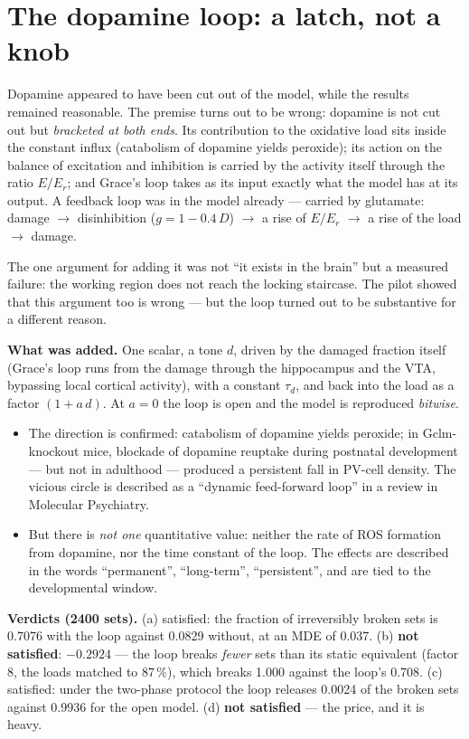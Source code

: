 \section{The dopamine loop: a latch, not a knob}\label{sec:dopa}
Dopamine appeared to have been cut out of the model, while the results remained reasonable. The premise turns out to be wrong: dopamine is not cut out but \emph{bracketed at both ends}. Its contribution to the oxidative load sits inside the constant influx (catabolism of dopamine yields peroxide); its action on the balance of excitation and inhibition is carried by the activity itself through the ratio $E/E_r$; and Grace's loop takes as its input exactly what the model has at its output. A feedback loop was in the model already --- carried by glutamate: damage $\to$ disinhibition ($g=1-0.4\,D$) $\to$ a rise of $E/E_r$ $\to$ a rise of the load $\to$ damage.

The one argument for adding it was not ``it exists in the brain'' but a measured failure: the working region does not reach the locking staircase. The pilot showed that this argument too is wrong --- but the loop turned out to be substantive for a different reason.

\textbf{What was added.} One scalar, a tone $d$, driven by the damaged fraction itself (Grace's loop runs from the damage through the hippocampus and the VTA, bypassing local cortical activity), with a constant $\tau_d$, and back into the load as a factor $(1+a\,d)$. At $a=0$ the loop is open and the model is reproduced \emph{bitwise}.

\facts
\begin{itemize}
\item The direction is confirmed: catabolism of dopamine yields peroxide; in Gclm-knockout mice, blockade of dopamine reuptake during postnatal development --- but not in adulthood --- produced a persistent fall in PV-cell density. The vicious circle is described as a ``dynamic feed-forward loop'' in a review in Molecular Psychiatry.\tP
\item But there is \emph{not one} quantitative value: neither the rate of ROS formation from dopamine, nor the time constant of the loop. The effects are described in the words ``permanent'', ``long-term'', ``persistent'', and are tied to the developmental window.\tS
\end{itemize}

\textbf{Verdicts (2400 sets).} (a) satisfied: the fraction of irreversibly broken sets is 0.7076 with the loop against 0.0829 without, at an MDE of 0.037. (b) \textbf{not satisfied}: $-0.2924$ --- the loop breaks \emph{fewer} sets than its static equivalent (factor 8, the loads matched to 87\,\%), which breaks 1.000 against the loop's 0.708. (c) satisfied: under the two-phase protocol the loop releases 0.0024 of the broken sets against 0.9936 for the open model. (d) \textbf{not satisfied} --- the price, and it is heavy.


